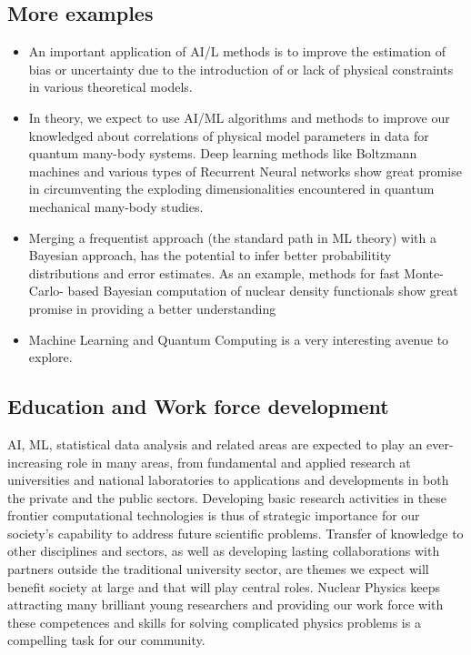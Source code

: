 \documentclass[%
oneside,                 %
final,                   %
10pt]{article}
\begin{document}
\noindent
\subsection{More examples}

\begin{itemize}
\item An important application of AI/L methods is to improve the estimation of bias or uncertainty due to the introduction of or lack of physical constraints in various theoretical models.

\item In theory, we expect to use AI/ML algorithms and methods to improve our knowledged about  correlations of physical model parameters in data for quantum many-body systems. Deep learning methods like Boltzmann machines and various types of Recurrent Neural networks show great promise in circumventing the exploding dimensionalities encountered in quantum mechanical many-body studies. 

\item Merging a frequentist approach (the standard path in ML theory) with a Bayesian approach, has the potential to infer better probabilitity distributions and error estimates. As an example, methods for fast Monte-Carlo- based Bayesian computation of nuclear density functionals show great promise in providing a better understanding 

\item Machine Learning and Quantum Computing is a very interesting avenue to explore.
\end{itemize}

\noindent
\subsection{Education and Work force development}

AI, ML, statistical data analysis and related areas are expected to
play an ever-increasing role in many areas, from fundamental and
applied research at universities and national laboratories to
applications and developments in both the private and the public
sectors.
Developing basic research activities in these frontier
computational technologies is thus of strategic importance for our
society’s capability to address future scientific problems. Transfer
of knowledge to other disciplines and sectors, as well as developing
lasting collaborations with partners outside the traditional
university sector, are themes we expect will benefit society at large
and that will play central roles. Nuclear Physics keeps attracting many brilliant young researchers and providing our work force with these competences and skills for solving complicated physics problems is a compelling task for our community.
\end{document}
